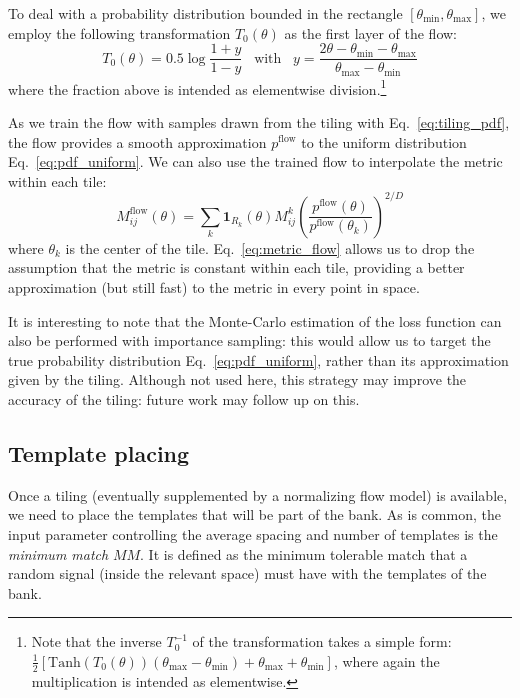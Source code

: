 \documentclass[twocolumn,showpacs,preprintnumbers,nofootinbib,prd,
superscriptaddress,10pt]{revtex4-2}
\begin{document}
To deal with a probability distribution bounded in the rectangle $[\theta_\text{min}, \theta_\text{max}]$, we employ the following transformation $T_0(\theta)$ as the first layer of the flow:
\begin{equation}
	T_0(\theta) = 0.5 \log \frac{1 + y}{1 - y} \;\;\; \text{with} \;\;\; y = \frac{2\theta - \theta_\text{min} - \theta_\text{max}}{\theta_\text{max}- \theta_\text{min}}
\end{equation}
where the fraction above is intended as elementwise division.\footnote{
Note that the inverse $T_0^{-1}$ of the transformation takes a simple form: $\frac{1}{2} [\text{Tanh}(T_0(\theta))(\theta_\text{max} - \theta_\text{min})+\theta_\text{max}+ \theta_\text{min}]$, where again the multiplication is intended as elementwise.
}

As we train the flow with samples drawn from the tiling with Eq.~\eqref{eq:tiling_pdf}, the flow provides a smooth approximation  $p^\text{flow}$ to the uniform distribution Eq.~\eqref{eq:pdf_uniform}.
We can also use the trained flow to interpolate the metric within each tile:
\begin{equation}\label{eq:metric_flow}
	M^{\text{flow}}_{ij}(\theta) = \sum_{k} \mathbf{1}_{R_k}(\theta) M^{k}_{ij} \left( \frac{p^{\text{flow}}(\theta)}{p^{\text{flow}}(\theta_k)}\right)^{2/D}
\end{equation}
where $\theta_k$ is the center of the tile.
Eq.~\eqref{eq:metric_flow} allows us to drop the assumption that the metric is constant within each tile, providing a better approximation (but still fast) to the metric in every point in space.

It is interesting to note that the Monte-Carlo estimation of the loss function can also be performed with importance sampling: this would allow us to target the true probability distribution Eq.~\eqref{eq:pdf_uniform}, rather than its approximation given by the tiling. Although not used here, this strategy may improve the accuracy of the tiling: future work may follow up on this.

\subsection{Template placing} \label{sec:template_placing}

Once a tiling (eventually supplemented by a normalizing flow model) is available, we need to place the templates that will be part of the bank.
As is common, the input parameter controlling the average spacing and number of templates is the {\it minimum match} $MM$. It is defined as the minimum tolerable match that a random signal (inside the relevant space) must have with the templates of the bank.
\end{document}
